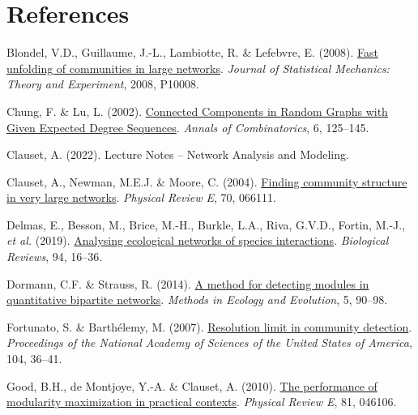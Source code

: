 \documentclass[
]{article}
\newlength{\cslhangindent}
\newlength{\cslentryspacingunit} %
\newenvironment{CSLReferences}[2] %
 {%
  \setlength{\parindent}{0pt}
  \ifodd #1
  \let\oldpar\par
  \def\par{\hangindent=\cslhangindent\oldpar}
  \fi
  \setlength{\parskip}{#2\cslentryspacingunit}
 }%
 {}
\begin{document}
\hypertarget{references}{%
\section*{References}\label{references}}

\hypertarget{refs}{}
\begin{CSLReferences}{1}{0}
\leavevmode{}%
Blondel, V.D., Guillaume, J.-L., Lambiotte, R. \& Lefebvre, E. (2008).
\href{https://doi.org/10.1088/1742-5468/2008/10/P10008}{Fast unfolding
of communities in large networks}. \emph{Journal of Statistical
Mechanics: Theory and Experiment}, 2008, P10008.

\leavevmode{}%
Chung, F. \& Lu, L. (2002).
\href{https://doi.org/10.1007/PL00012580}{Connected {Components} in
{Random Graphs} with {Given Expected Degree Sequences}}. \emph{Annals of
Combinatorics}, 6, 125--145.

\leavevmode{}%
Clauset, A. (2022). Lecture {Notes} -- {Network Analysis} and
{Modeling}.

\leavevmode{}%
Clauset, A., Newman, M.E.J. \& Moore, C. (2004).
\href{https://doi.org/10.1103/PhysRevE.70.066111}{Finding community
structure in very large networks}. \emph{Physical Review E}, 70, 066111.

\leavevmode{}%
Delmas, E., Besson, M., Brice, M.-H., Burkle, L.A., Riva, G.V.D.,
Fortin, M.-J., \emph{et al.} (2019).
\href{https://doi.org/10.1111/brv.12433}{Analysing ecological networks
of species interactions}. \emph{Biological Reviews}, 94, 16--36.

\leavevmode{}%
Dormann, C.F. \& Strauss, R. (2014).
\href{https://doi.org/10.1111/2041-210X.12139}{A method for detecting
modules in quantitative bipartite networks}. \emph{Methods in Ecology
and Evolution}, 5, 90--98.

\leavevmode{}%
Fortunato, S. \& Barthélemy, M. (2007).
\href{https://doi.org/10.1073/pnas.0605965104}{Resolution limit in
community detection}. \emph{Proceedings of the National Academy of
Sciences of the United States of America}, 104, 36--41.

\leavevmode{}%
Good, B.H., de Montjoye, Y.-A. \& Clauset, A. (2010).
\href{https://doi.org/10.1103/PhysRevE.81.046106}{The performance of
modularity maximization in practical contexts}. \emph{Physical Review
E}, 81, 046106.


\end{CSLReferences}
\end{document}
